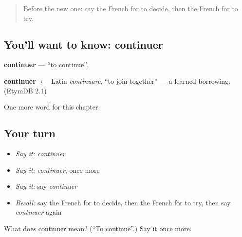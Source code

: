\begin{quote}
Before the new one: say the French for to decide, then the French for to try.
\end{quote}

\subsection*{You'll want to know: continuer}
\textbf{continuer} — \textquotedblleft{}to continue\textquotedblright{}.

\begin{cousinweb}
\textbf{continuer} $\leftarrow$ Latin \emph{continuare}, \textquotedblleft{}to join together\textquotedblright{} — a learned borrowing. (EtymDB 2.1)
\end{cousinweb}

\begin{grammarlens}[title={What you've built}]
One more word for this chapter.
\end{grammarlens}

\subsection*{Your turn}
\begin{itemize}
\raggedright
  \item \emph{Say it:} \emph{continuer}
  \item \emph{Say it:} \emph{continuer}, once more
  \item \emph{Say it:} say \emph{continuer}
  \item \emph{Recall:} say the French for to decide, then the French for to try, then say \emph{continuer} again
\end{itemize}

\begin{tcolorbox}[breakable,colback=teal!4,colframe=teal!35!black,title={Before you move on}]
What does continuer mean? (\textquotedblleft{}To continue\textquotedblright{}.) Say it once more.
\end{tcolorbox}
